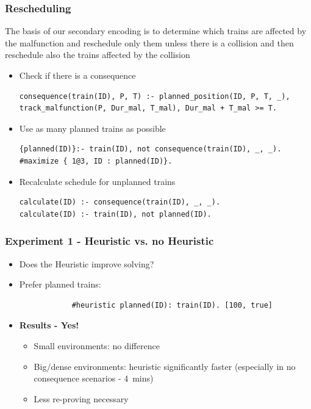 \documentclass{beamer}
\begin{document}
\begin{frame}[fragile]
	\frametitle{Rescheduling}
	The basis of our secondary encoding is to determine which 
	trains are affected by the malfunction
	and reschedule only them unless there is a collision
	and then reschedule also the trains affected by the collision
	\begin{small}
	\begin{itemize}
		\item Check if there is a consequence
			\begin{verbatim}
consequence(train(ID), P, T) :- planned_position(ID, P, T, _),
track_malfunction(P, Dur_mal, T_mal), Dur_mal + T_mal >= T.\end{verbatim}
		\item Use as many planned trains as possible
			\begin{verbatim}
{planned(ID)}:- train(ID), not consequence(train(ID), _, _).
#maximize { 1@3, ID : planned(ID)}.\end{verbatim}
		\item Recalculate schedule for unplanned trains
			\begin{verbatim}
calculate(ID) :- consequence(train(ID), _, _).
calculate(ID) :- train(ID), not planned(ID).\end{verbatim}	
	\end{itemize}
	\end{small}

\end{frame}


\begin{frame}[fragile]
	\frametitle{Experiment 1 - Heuristic vs. no Heuristic}
	\begin{itemize}
		\item Does the Heuristic improve solving?
		\item Prefer planned trains:
		\begin{verbatim}
			#heuristic planned(ID): train(ID). [100, true] \end{verbatim}
		\vspace{0.7cm}
		\item \textbf{Results - Yes!}
		\begin{itemize}
			\item Small environments: no difference
			\item Big/dense environments: heuristic significantly faster (especially in no consequence scenarios - 4~mins)
			\item[$\rightarrow$] Less re-proving necessary
		\end{itemize}
	\end{itemize}
	
\end{frame}
\end{document}
